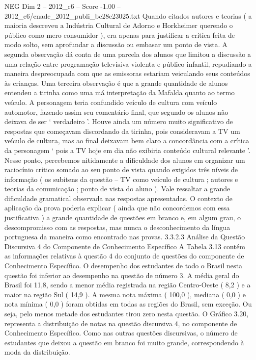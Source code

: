 \begin{textsample}{NEG Dim 2 – 2012\_c6 – Score -1.00 – 2012\_c6/enade\_2012\_publi\_bc28e23025.txt}
Quando citados autores e teorias ( a maioria descreveu a Indústria Cultural de Adorno e Horkheimer querendo o público como mero consumidor ), era apenas para justificar a crítica feita de modo solto, sem aprofundar a discussão ou embasar um ponto de vista.
A segunda observação dá conta de uma parcela dos alunos que limitou a discussão a uma relação entre programação televisiva violenta e público infantil, repudiando a maneira despreocupada com que as emissoras estariam veiculando seus conteúdos às crianças.
Uma terceira observação é que a grande quantidade de alunos entendeu a tirinha como uma má interpretação da Mafalda quanto ao termo veículo.
A personagem teria confundido veículo de cultura com veículo automotor, fazendo assim seu comentário final, que segundo os alunos não deixava de ser ‘ verdadeiro ’.
Houve ainda um número muito significativo de respostas que começavam discordando da tirinha, pois consideravam a TV um veículo de cultura, mas ao final deixavam bem claro a concordância com a crítica da personagem ‘ pois a TV hoje em dia não exibiria conteúdo cultural relevante ’.
Nesse ponto, percebemos nitidamente a dificuldade dos alunos em organizar um raciocínio crítico somado ao seu ponto de vista quando exigidos três níveis de informação ( os subitens da questão – TV como veículo de cultura ; autores e teorias da comunicação ; ponto de vista do aluno ).
Vale ressaltar a grande dificuldade gramatical observada nas respostas apresentadas.
O contexto de aplicação da prova poderia explicar ( ainda que não concordemos com essa justificativa ) a grande quantidade de questões em branco e, em algum grau, o descompromisso com as respostas, mas nunca o desconhecimento da língua portuguesa da maneira como encontrado nas provas. 3.3.2.3 Análise da Questão Discursiva 4 do Componente de Conhecimento Específico A Tabela 3.13 contém as informações relativas à questão 4 do conjunto de questões do componente de Conhecimento Específico.
O desempenho dos estudantes de todo o Brasil nesta questão foi inferior ao desempenho na questão de número 3.
A média geral do Brasil foi 11,8, sendo a menor média registrada na região Centro-Oeste ( 8,2 ) e a maior na região Sul ( 14,9 ).
A mesma nota máxima ( 100,0 ), mediana ( 0,0 ) e nota mínima ( 0,0 ) foram obtidas em todas as regiões do Brasil, sem exceção.
Ou seja, pelo menos metade dos estudantes tirou zero nesta questão.
O Gráfico 3.20, representa a distribuição de notas na questão discursiva 4, no componente de Conhecimento Específico.
Como nas outras questões discursivas, o número de estudantes que deixou a questão em branco foi muito grande, correspondendo à moda da distribuição.

\end{textsample}

